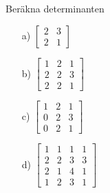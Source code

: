 Beräkna determinanten
\begin{itemize}
	\item[a) ] $\begin{bmatrix}2&3\\2&1\end{bmatrix}$
	\item[b) ] $\begin{bmatrix}1&2&1\\2&2&3\\2&2&1\end{bmatrix}$
	\item[c) ] $\begin{bmatrix}1&2&1\\0&2&3\\0&2&1\end{bmatrix}$
	\item[d) ] $\begin{bmatrix}1&1&1&1\\2&2&3&3\\2&1&4&1\\1&2&3&1\end{bmatrix}$
\end{itemize}